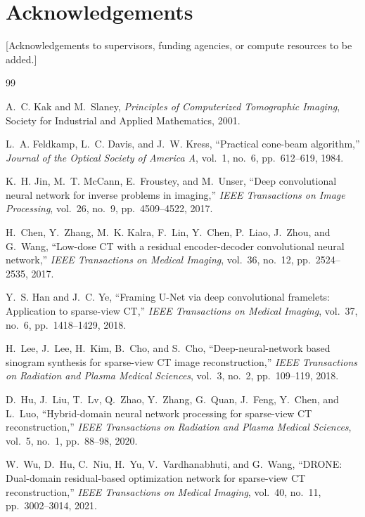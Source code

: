 \documentclass[10pt,twocolumn]{article}
\begin{document}
\section*{Acknowledgements}

[Acknowledgements to supervisors, funding agencies, or compute
resources to be added.]


\begin{thebibliography}{99}

A.~C. Kak and M.~Slaney,
\textit{Principles of Computerized Tomographic Imaging},
Society for Industrial and Applied Mathematics, 2001.

L.~A. Feldkamp, L.~C. Davis, and J.~W. Kress,
``Practical cone-beam algorithm,''
\textit{Journal of the Optical Society of America A},
vol.~1, no.~6, pp.~612--619, 1984.

K.~H. Jin, M.~T. McCann, E.~Froustey, and M.~Unser,
``Deep convolutional neural network for inverse problems in imaging,''
\textit{IEEE Transactions on Image Processing},
vol.~26, no.~9, pp.~4509--4522, 2017.

H.~Chen, Y.~Zhang, M.~K. Kalra, F.~Lin, Y.~Chen, P.~Liao,
J.~Zhou, and G.~Wang,
``Low-dose CT with a residual encoder-decoder convolutional neural network,''
\textit{IEEE Transactions on Medical Imaging},
vol.~36, no.~12, pp.~2524--2535, 2017.

Y.~S. Han and J.~C. Ye,
``Framing U-Net via deep convolutional framelets: Application to sparse-view CT,''
\textit{IEEE Transactions on Medical Imaging},
vol.~37, no.~6, pp.~1418--1429, 2018.

H.~Lee, J.~Lee, H.~Kim, B.~Cho, and S.~Cho,
``Deep-neural-network based sinogram synthesis for sparse-view CT image reconstruction,''
\textit{IEEE Transactions on Radiation and Plasma Medical Sciences},
vol.~3, no.~2, pp.~109--119, 2018.

D.~Hu, J.~Liu, T.~Lv, Q.~Zhao, Y.~Zhang, G.~Quan, J.~Feng,
Y.~Chen, and L.~Luo,
``Hybrid-domain neural network processing for sparse-view CT reconstruction,''
\textit{IEEE Transactions on Radiation and Plasma Medical Sciences},
vol.~5, no.~1, pp.~88--98, 2020.

W.~Wu, D.~Hu, C.~Niu, H.~Yu, V.~Vardhanabhuti, and G.~Wang,
``DRONE: Dual-domain residual-based optimization network for
sparse-view CT reconstruction,''
\textit{IEEE Transactions on Medical Imaging},
vol.~40, no.~11, pp.~3002--3014, 2021.


\end{thebibliography}
\end{document}
